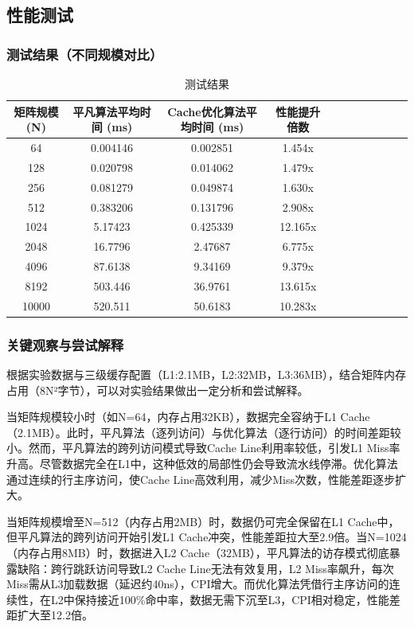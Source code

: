 \documentclass[a4paper]{article}
\begin{document}
\subsection{性能测试}
\subsubsection{测试结果（不同规模对比）}
\begin{table}[!htbp]
	\centering
	\begin{tabular}{ccccccccccc}
		\toprule  
		矩阵规模 (N)& 平凡算法平均时间 (ms)& Cache优化算法平均时间 (ms)	& 性能提升倍数\\
		\midrule
		64& 0.004146& 0.002851& 1.454x\\
		128&0.020798& 0.014062& 1.479x\\
		256& 0.081279& 0.049874& 1.630x\\
		512& 0.383206& 0.131796& 2.908x\\
		1024& 5.17423& 0.425339& 12.165x\\
		2048& 16.7796& 2.47687& 6.775x\\
		4096& 87.6138& 9.34169& 9.379x\\
		8192& 503.446& 36.9761& 13.615x\\
		10000& 520.511& 50.6183& 10.283x\\
		\bottomrule
	\end{tabular}
	\caption{测试结果}
	\label{table:t2}
\end{table}
\subsubsection{关键观察与尝试解释}
根据实验数据与三级缓存配置（L1:2.1MB，L2:32MB，L3:36MB），结合矩阵内存占用（8N²字节），可以对实验结果做出一定分析和尝试解释。

当矩阵规模较小时（如N=64，内存占用32KB），数据完全容纳于L1 Cache（2.1MB）。此时，平凡算法（逐列访问）与优化算法（逐行访问）的时间差距较小。然而，平凡算法的跨列访问模式导致Cache Line利用率较低，引发L1 Miss率升高。尽管数据完全在L1中，这种低效的局部性仍会导致流水线停滞。优化算法通过连续的行主序访问，使Cache Line高效利用，减少Miss次数，性能差距逐步扩大。

当矩阵规模增至N=512（内存占用2MB）时，数据仍可完全保留在L1 Cache中，但平凡算法的跨列访问开始引发L1 Cache冲突，性能差距拉大至2.9倍。当N=1024（内存占用8MB）时，数据进入L2 Cache（32MB），平凡算法的访存模式彻底暴露缺陷：跨行跳跃访问导致L2 Cache Line无法有效复用，L2 Miss率飙升，每次Miss需从L3加载数据（延迟约40ns），CPI增大。而优化算法凭借行主序访问的连续性，在L2中保持接近100\%命中率，数据无需下沉至L3，CPI相对稳定，性能差距扩大至12.2倍。
\end{document}
